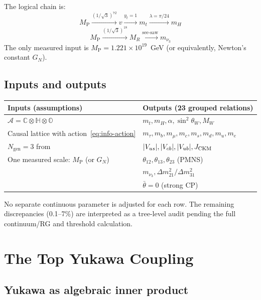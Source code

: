 \documentclass[12pt,a4paper]{article}
\theoremstyle{definition}
\theoremstyle{remark}
\newcommand{\Oct}{\mathbb{O}}
\newcommand{\Quat}{\mathbb{H}}
\newcommand{\Comp}{\mathbb{C}}
\newcommand{\Alg}{\mathcal{A}}
\newcommand{\MP}{M_{\mathrm{P}}}
\newcommand{\MR}{M_R}
\begin{document}
The logical chain is:
\begin{equation}
\MP \xrightarrow{(1/\sqrt{3})^{72}} v 
\xrightarrow{y_t=1} m_t 
\xrightarrow{\lambda=\pi/24} m_H
\end{equation}
\begin{equation}
\MP \xrightarrow{(1/\sqrt{3})^{18}} \MR 
\xrightarrow{\text{see-saw}} m_{\nu_3}
\end{equation}
The only measured input is $\MP = 1.221\times 10^{19}$~GeV (or equivalently, 
Newton's constant $G_N$).

\subsection*{Inputs and outputs}

\begin{center}
\begin{tabular}{ll}
\hline
\textbf{Inputs (assumptions)} & \textbf{Outputs (23 grouped relations)} \\
\hline
$\Alg = \Comp\otimes\Quat\otimes\Oct$ & $m_t, m_H, \alpha, \sin^2\theta_W, M_W$ \\
Causal lattice with action~\eqref{eq:info-action} & $m_\tau, m_b, m_\mu, m_c, m_s, m_d, m_u, m_e$ \\
$N_{\mathrm{gen}} = 3$ from~\cite{Paper1} & $|V_{us}|, |V_{cb}|, |V_{ub}|, J_{\rm CKM}$ \\
One measured scale: $\MP$ (or $G_N$) & $\theta_{12}, \theta_{13}, \theta_{23}$ (PMNS) \\
 & $m_{\nu_3}, \Delta m^2_{21}/\Delta m^2_{31}$ \\
 & $\bar\theta = 0$ (strong CP) \\
\hline
\end{tabular}
\end{center}
\noindent No separate continuous parameter is adjusted for each row. The remaining 
discrepancies (0.1--7\%) are interpreted as a tree-level audit pending the 
full continuum/RG and threshold calculation.

\section{The Top Yukawa Coupling}
\label{sec:top-yukawa}

\subsection{Yukawa as algebraic inner product}
\end{document}
